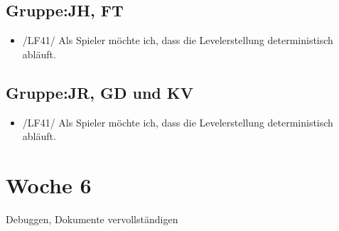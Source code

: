 \documentclass[11pt,a4paper]{article}
\begin{document}
\subsection*{Gruppe:JH, FT}
\begin{itemize}
\item /LF41/ Als Spieler möchte ich, dass die Levelerstellung deterministisch abläuft.
\end{itemize}

\subsection*{Gruppe:JR, GD und KV}
\begin{itemize}
\item /LF41/ Als Spieler möchte ich, dass die Levelerstellung deterministisch abläuft.
\end{itemize}

\section*{Woche 6}
Debuggen, Dokumente vervollständigen
\end{document}
